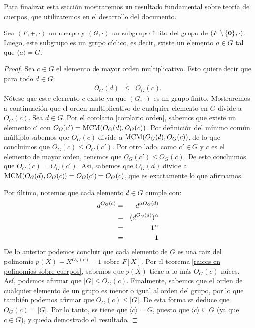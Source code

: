 Para finalizar esta sección mostraremos un resultado fundamental sobre
teoría de cuerpos, que utilizaremos en el desarrollo del documento.
\begin{theorem}\label{subgrupo de cuerpo  es ciclico}
Sea $(F,+,\cdot)$ un cuerpo y $(G,\cdot)$ un subgrupo finito del grupo
de $(F\setminus\{\mathbf{0}\},\cdot)$.
Luego, este subgrupo es un grupo cíclico, es decir, existe un elemento
$a\in G$ tal que $\langle a\rangle = G$.
\end{theorem}
\begin{proof}
Sea $c\in G$ el elemento de mayor orden multiplicativo. Esto quiere
decir que para todo $d\in G$:
\begin{eqnarray*}
O_G(d) & \leq & O_G(c).
\end{eqnarray*}
Nótese que este elemento $c$ existe ya que $(G,\cdot)$ es un grupo
finito.  Mostraremos a continuación que el orden multiplicativo de
cualquier elemento en $G$ divide a $O_G(c)$. Sea $d\in G$. Por el
corolario \ref{corolario orden}, sabemos que existe un elemento $c'$
con $O_G(c') = {\rm MCM}(O_G(d),O_G(c))$. Por definición del mínimo común
múltiplo sabemos que $O_G(c)$ divide a ${\rm MCM}(O_G(d),O_G(c))$, de lo
que concluimos que $O_G(c)\leq O_G(c')$. Por otro lado, como $c'\in G$
y $c$ es el elemento de mayor orden, tenemos que $O_G(c')\leq
O_G(c)$. De esto concluimos que $O_G(c)=O_G(c')$. Así, sabemos que
$O_G(d)$ divide a ${\rm MCM}(O_G(d),O_G(c)) = O_G(c') = O_G(c)$, que es
exactamente lo que afirmamos.
	
	Por último, notemos que cada elemento $d\in G$ cumple con:
	\begin{eqnarray*}
		d^{O_G(c)} &=& d^{\alpha O_G(d)}\\
		&=& (d^{O_G(d)})^{\alpha}\\
		&=& \mathbf{1}^{\alpha}\\
		&=& \mathbf{1}
	\end{eqnarray*}
%
De lo anterior podemos concluir que cada elemento de $G$ es una raiz
del polinomio $p(X)=X^{O_G(c)} - 1$ sobre $F[X]$. Por el
teorema \ref{raices en polinomios sobre cuerpos}, sabemos que $p(X)$
tiene a lo más $O_G(c)$ raíces. Así, podemos afirmar que $|G|\leq
O_G(c)$. Finalmente, sabemos que el orden de cualquier elemento de un
grupo es menor o igual al orden del grupo, por lo que también podemos
afirmar que $O_G(c)\leq |G|$. De esta forma se deduce que
$O_G(c)= |G|$. Por lo tanto, se tiene que $\langle c\rangle = G$, puesto
que $\langle c\rangle \subseteq G$ (ya que $c \in G$), y queda
demostrado el~resultado.
\end{proof}
